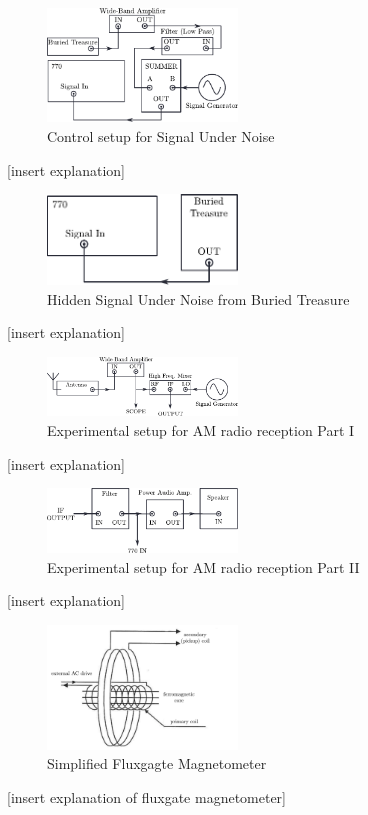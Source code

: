 \documentclass[prl,twocolumn,superscriptaddress,floatfix]{revtex4}
\begin{document}
\begin{figure}[H]
    \includegraphics[width=0.45\textwidth]{exp1_1.pdf}
    \caption{Control setup for Signal Under Noise}
    \label{fig:exp1}
\end{figure}
[insert explanation]
\begin{figure}[H]
    \includegraphics[width=0.45\textwidth]{exp1_2.pdf}
    \caption{Hidden Signal Under Noise from Buried Treasure}
    \label{fig:exp2}
\end{figure}
[insert explanation]
\begin{figure}[H]
    \includegraphics[width=0.45\textwidth]{exp2_1.pdf}
    \caption{Experimental setup for AM radio reception Part I}
    \label{fig:AM1}
\end{figure}
[insert explanation]
\begin{figure}[H]
    \includegraphics[width=0.45\textwidth]{exp2_2.pdf}
    \caption{Experimental setup for AM radio reception Part II}
    \label{fig:AM2}
\end{figure}
[insert explanation]
\begin{figure}[H]
    \includegraphics[width=0.45\textwidth]{exp3_1.pdf}
    \caption{Simplified Fluxgagte Magnetometer}
    \label{fig:fluxgate}
\end{figure}
[insert explanation of fluxgate magnetometer]
\end{document}

